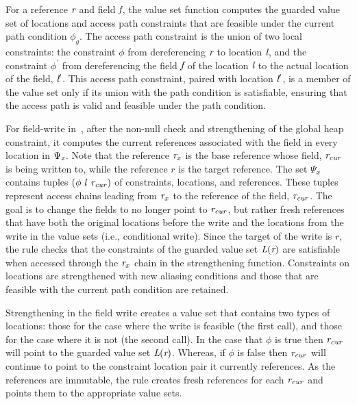   

For a reference $\emph{r}$ and field $\emph{f}$, the value set function computes 
the guarded value set of locations and access path constraints
that are feasible under the current path condition $\phi_g$.
The access path constraint is the union of two local constraints: 
the constraint $\phi$ from dereferencing $\emph{r}$ to location $\emph{l}$, 
and the constraint $\phi^\prime$ from dereferencing the field $\emph{f}$ of the location $\emph{l}$ to the actual location of the field, $\emph{l}^\prime$. 
This access path constraint, paired with location $\emph{l}^\prime$, is a member of the value set only if its union with the path condition is satisfiable, ensuring that the access path is valid and feasible under the path condition.


For field-write in~, after the non-null check and
strengthening of the global heap constraint, it computes the current
references associated with the field in every location in
$\Psi_{\emph{x}}$. Note that the reference $\emph{r}_x$ is the base
reference whose field, $\emph{r}_\mathit{cur}$ is being written to,
while the reference $r$ is the target reference. The set $\Psi_x$
contains tuples $(\phi\ l\ \cfgnt{r}_\mathit{cur})$ of constraints,
locations, and references. These tuples represent access chains
leading from $\emph{r}_x$ to the reference of the field,
$\emph{r}_\mathit{cur}$. The goal is to change the fields to no
longer point to $\emph{r}_\mathit{cur}$, but rather fresh references
that have both the original locations before the write and the
locations from the write in the value sets (i.e., conditional
write). Since the target of the write is $r$, the rule checks that the
constraints of the guarded value set $\emph{L}(\emph{r})$ are satisfiable
when accessed through the $\emph{r}_x$ chain in the strengthening
function.   Constraints on locations are strengthened
with new aliasing conditions and those that are feasible with the
current path condition are retained.

Strengthening in the field write creates a value set that contains two
types of locations: those for the case where the write is feasible
(the first call), and those for the case where it is not (the second
call). In the case that $\phi$ is true then $\emph{r}_\mathit{cur}$
will point to the guarded value set $\emph{L}(\emph{r})$.
Whereas, if $\phi$ is false then $\emph{r}_\mathit{cur}$ will
continue to point to the constraint location pair it currently
references.  As the references are immutable, the rule creates fresh
references for each $\emph{r}_\mathit{cur}$ and points them to the
appropriate value sets.

